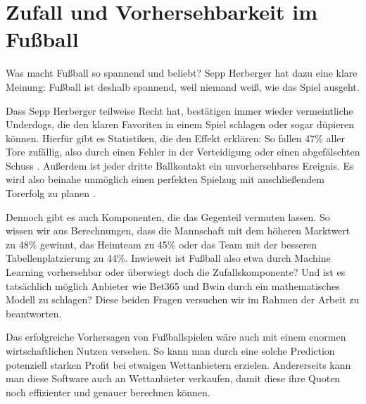\chapter{Zufall und Vorhersehbarkeit im Fußball}
	
Was macht Fußball so spannend und beliebt? Sepp Herberger hat dazu eine klare Meinung:
\glqq Fußball ist deshalb spannend, weil niemand weiß, wie das Spiel ausgeht.\grqq 

Dass Sepp Herberger teilweise Recht hat, bestätigen immer wieder vermeintliche Underdogs, die den klaren Favoriten in einem Spiel schlagen oder sogar düpieren können. Hierfür gibt es Statistiken, die den Effekt erklären: So fallen 47\% aller Tore zufällig, also durch einen Fehler in der Verteidigung oder einen abgefälschten Schuss \autocite[Vgl.][]{.06102018}. Außerdem ist jeder dritte Ballkontakt ein unvorhersehbares Ereignis. Es wird also beinahe unmöglich einen perfekten Spielzug mit anschließendem Torerfolg zu planen \autocite[Vgl.][]{.}.

Dennoch gibt es auch Komponenten, die das Gegenteil vermuten lassen.
So wissen wir aus Berechnungen, dass die Mannschaft mit dem höheren Marktwert zu 48\% gewinnt, das Heimteam zu 45\% oder das Team mit der besseren Tabellenplatzierung zu 44\%. 
Inwieweit ist Fußball also etwa durch Machine Learning vorhersehbar oder überwiegt doch die Zufallskomponente? Und ist es tatsächlich möglich Anbieter wie Bet365 und Bwin durch ein mathematisches Modell zu schlagen? Diese beiden Fragen versuchen wir im Rahmen der Arbeit zu beantworten.

Das erfolgreiche Vorhersagen von Fußballspielen wäre auch mit einem enormen wirtschaftlichen Nutzen versehen. So kann man durch eine solche Prediction potenziell starken Profit bei etwaigen Wettanbietern erzielen. Andererseits kann man diese Software auch an Wettanbieter verkaufen, damit diese ihre Quoten noch effizienter und genauer berechnen können.



